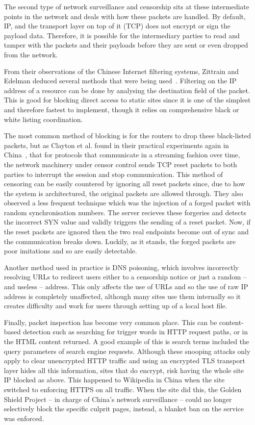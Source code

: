 \documentclass[ %
                    author={Samuel Russell},
                supervisor={Prof. Bogdan Warinschi},
                    degree={MEng},
                     title={Innocuous Ciphertexts},
                  subtitle={The DE-CENSOR Scheme},
                      type={research},
                      year={2018} ]{dissertation}
\begin{document}
The second type of network surveillance and censorship sits at these intermediate points in the network and deals with how these packets are handled. By default, IP, and the transport layer on top of it (TCP) does not encrypt or sign the payload data. Therefore, it is possible for the intermediary parties to read and tamper with the packets and their payloads before they are sent or even dropped from the network.

From their observations of the Chinese Internet filtering systems, Zittrain and Edelman deduced several methods that were being used~\cite{edelman2005empirical}.
Filtering on the IP address of a resource can be done by analysing the destination field of the packet. This is good for blocking direct access to static sites since it is one of the simplest and therefore fastest to implement, though it relies on comprehensive black or white listing coordination.

The most common method of blocking is for the routers to drop these black-listed packets, but as Clayton et al. found in their practical experiments again in China~\cite{clayton2006ignoring}, that for protocols that communicate in a streaming fashion over time, the network machinery under censor control sends TCP reset packets to both parties to interrupt the session and stop communication. This method of censoring can be easily countered by ignoring all reset packets since, due to how the system is architectured, the original packets are allowed through. They also observed a less frequent technique which was the injection of a forged packet with random synchronisation numbers. The server recieves these forgeries and detects the incorrect SYN value and validly triggers the sending of a reset packet. Now, if the reset packets are ignored then the two real endpoints become out of sync and the communication breaks down. Luckily, as it stands, the forged packets are poor imitations and so are easily detectable.

Another method used in practice is DNS poisoning, which involves incorrectly resolving URLs to redirect users either to a censorship notice or just a random -- and useless -- address. This only affects the use of URLs and so the use of raw IP address is completely unaffected, although many sites use them internally so it creates difficulty and work for users through setting up of a local host file.

Finally, packet inspection has become very common place. This can be content-based detection such as searching for trigger words in HTTP request paths, or in the HTML content returned. A good example of this is search terms included the query parameters of search engine requests. Although these snooping attacks only apply to clear unencrypted HTTP traffic and using an encrypted  TLS transport layer hides all this information, sites that do encrypt, risk having the whole site IP blocked as above. This happened to Wikipedia in China when the site switched to enforcing HTTPS on all traffic. When the site did this, the Golden Shield Project -- in charge of China's network surveillance -- could no longer selectively block the specific culprit pages, instead, a blanket ban on the service was enforced.
\end{document}
